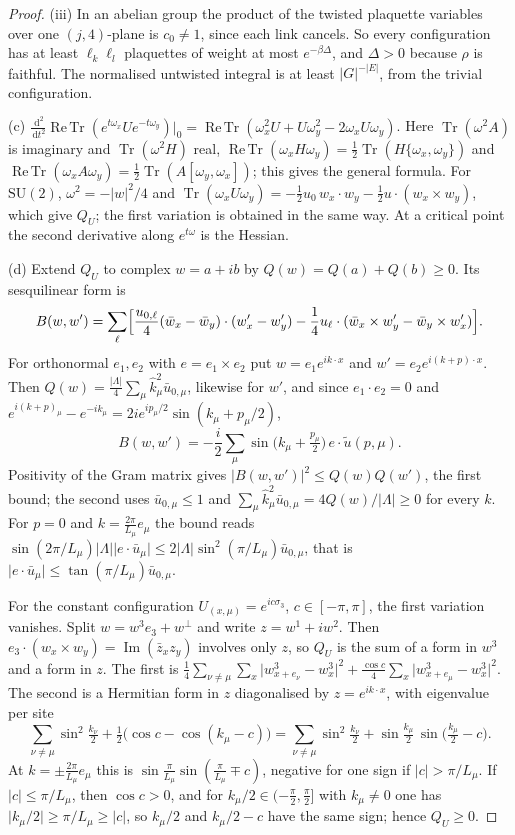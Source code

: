 \documentclass[11pt,a4paper]{amsart}
\theoremstyle{definition}
\theoremstyle{remark}
\numberwithin{equation}{section}
\DeclareMathOperator{\Tr}{Tr}        %
\DeclareMathOperator{\ReTr}{Re\,Tr}  %
\newcommand{\abs}[1]{\lvert #1\rvert}      %
\newcommand{\dd}{\,\mathrm{d}}             %
\newcommand{\SU}{\mathrm{SU}}              %
\begin{document}
\begin{proof}
(iii) In an abelian group the product of the twisted plaquette variables over one $(j,4)$-plane is $c_0\ne1$, since each link cancels. So every configuration has at least $\ell_k\ell_l$ plaquettes of weight at most $e^{-\beta\Delta}$, and $\Delta>0$ because $\rho$ is faithful. The normalised untwisted integral is at least $\abs G^{-\abs E}$, from the trivial configuration.

(c) $\frac{\dd^2}{\dd t^2}\ReTr(e^{t\omega_x}Ue^{-t\omega_y})|_0=\ReTr(\omega_x^2U+U\omega_y^2-2\omega_xU\omega_y)$. Here $\Tr(\omega^2A)$ is imaginary and $\Tr(\omega^2H)$ real, $\ReTr(\omega_xH\omega_y)=\frac12\Tr(H\{\omega_x,\omega_y\})$ and $\ReTr(\omega_xA\omega_y)=\frac12\Tr(A[\omega_y,\omega_x])$; this gives the general formula. For $\SU(2)$, $\omega^2=-\abs w^2/4$ and $\Tr(\omega_xU\omega_y)=-\frac12u_0\,w_x\cdot w_y-\frac12u\cdot(w_x\times w_y)$, which give $Q_U$; the first variation is obtained in the same way. At a critical point the second derivative along $e^{t\omega}$ is the Hessian.

(d) Extend $Q_U$ to complex $w=a+ib$ by $Q(w)=Q(a)+Q(b)\ge0$. Its sesquilinear form is
\[
B(w,w')=\sum_\ell\Bigl[\frac{u_{0,\ell}}4(\bar w_x-\bar w_y)\cdot(w'_x-w'_y)-\frac14u_\ell\cdot(\bar w_x\times w'_y-\bar w_y\times w'_x)\Bigr].
\]
For orthonormal $e_1,e_2$ with $e=e_1\times e_2$ put $w=e_1e^{ik\cdot x}$ and $w'=e_2e^{i(k+p)\cdot x}$. Then $Q(w)=\frac{\abs\Lambda}4\sum_\mu\hat k_\mu^2\bar u_{0,\mu}$, likewise for $w'$, and since $e_1\cdot e_2=0$ and $e^{i(k+p)_\mu}-e^{-ik_\mu}=2ie^{ip_\mu/2}\sin(k_\mu+p_\mu/2)$,
\[
B(w,w')=-\frac i2\sum_\mu\sin\bigl(k_\mu+\tfrac{p_\mu}2\bigr)\,e\cdot\tilde u(p,\mu).
\]
Positivity of the Gram matrix gives $\abs{B(w,w')}^2\le Q(w)Q(w')$, the first bound; the second uses $\bar u_{0,\mu}\le1$ and $\sum_\mu\hat k_\mu^2\bar u_{0,\mu}=4Q(w)/\abs\Lambda\ge0$ for every $k$. For $p=0$ and $k=\frac{2\pi}{L_\mu}e_\mu$ the bound reads $\sin(2\pi/L_\mu)\abs\Lambda\abs{e\cdot\bar u_\mu}\le2\abs\Lambda\sin^2(\pi/L_\mu)\bar u_{0,\mu}$, that is $\abs{e\cdot\bar u_\mu}\le\tan(\pi/L_\mu)\bar u_{0,\mu}$.

For the constant configuration $U_{(x,\mu)}=e^{ic\sigma_3}$, $c\in[-\pi,\pi]$, the first variation vanishes. Split $w=w^3e_3+w^\perp$ and write $z=w^1+iw^2$. Then $e_3\cdot(w_x\times w_y)=\operatorname{Im}(\bar z_xz_y)$ involves only $z$, so $Q_U$ is the sum of a form in $w^3$ and a form in $z$. The first is $\frac14\sum_{\nu\ne\mu}\sum_x\abs{w^3_{x+e_\nu}-w^3_x}^2+\frac{\cos c}4\sum_x\abs{w^3_{x+e_\mu}-w^3_x}^2$. The second is a Hermitian form in $z$ diagonalised by $z=e^{ik\cdot x}$, with eigenvalue per site
\[
\sum_{\nu\ne\mu}\sin^2\tfrac{k_\nu}2+\tfrac12\bigl(\cos c-\cos(k_\mu-c)\bigr)=\sum_{\nu\ne\mu}\sin^2\tfrac{k_\nu}2+\sin\tfrac{k_\mu}2\,\sin\bigl(\tfrac{k_\mu}2-c\bigr).
\]
At $k=\pm\frac{2\pi}{L_\mu}e_\mu$ this is $\sin\frac\pi{L_\mu}\sin(\frac\pi{L_\mu}\mp c)$, negative for one sign if $\abs c>\pi/L_\mu$. If $\abs c\le\pi/L_\mu$, then $\cos c>0$, and for $k_\mu/2\in(-\frac\pi2,\frac\pi2]$ with $k_\mu\ne0$ one has $\abs{k_\mu/2}\ge\pi/L_\mu\ge\abs c$, so $k_\mu/2$ and $k_\mu/2-c$ have the same sign; hence $Q_U\ge0$.


\end{proof}
\end{document}
